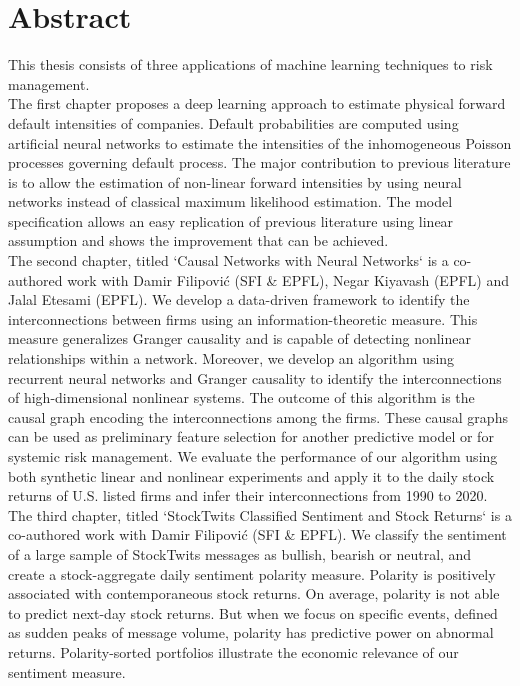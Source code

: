 

\cleardoublepage
\chapter*{Abstract}

This thesis consists of three applications of machine learning techniques to risk management. \\

The first chapter proposes a deep learning approach to estimate physical forward default intensities of companies. Default probabilities are computed using artificial neural networks to estimate the intensities of the inhomogeneous Poisson processes governing default process. The major contribution to previous literature is to allow the estimation of non-linear forward intensities by using neural networks instead of classical maximum likelihood estimation. The model specification allows an easy replication of previous literature using linear assumption and shows the improvement that can be achieved. \\

The second chapter, titled `Causal Networks with Neural Networks` is a co-authored work with Damir Filipović (SFI \& EPFL), Negar Kiyavash (EPFL) and Jalal Etesami (EPFL). We develop a data-driven framework to identify the interconnections between firms using an information-theoretic measure. 
This measure generalizes Granger causality and is capable of detecting nonlinear relationships within a network. 
Moreover, we develop an algorithm using recurrent neural networks and Granger causality to identify the interconnections of high-dimensional nonlinear systems. 
The outcome of this algorithm is the causal graph encoding the interconnections among the firms.
These causal graphs can be used as preliminary feature selection for another predictive model or for systemic risk management.
We evaluate the performance of our algorithm using both synthetic linear and nonlinear experiments and apply it to the daily stock returns of U.S. listed firms and infer their interconnections from 1990 to 2020. \\

The third chapter, titled `StockTwits Classified Sentiment and Stock Returns` is a co-authored work with Damir Filipović (SFI \& EPFL). We classify the sentiment of a large sample of StockTwits messages as bullish, bearish or neutral, and create a stock-aggregate daily sentiment polarity measure. Polarity is positively associated with contemporaneous stock returns. On average, polarity is not able to predict next-day stock returns. But when we focus on specific events, defined as sudden peaks of message volume, polarity has predictive power on abnormal returns. Polarity-sorted portfolios illustrate the economic relevance of our sentiment measure. \\


